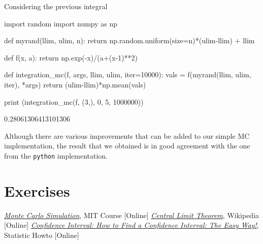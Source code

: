 Considering the previous integral

\begin{ipython}
import random 
import numpy as np

def myrand(llim, ulim, n):
    return np.random.uniform(size=n)*(ulim-llim) + llim

def f(x, a):
    return np.exp(-x)/(a+(x-1)**2)

def integration_mc(f, args, llim, ulim, iter=10000):
    vals = f(myrand(llim, ulim, iter), *args)
    return (ulim-llim)*np.mean(vals)

print (integration_mc(f, (3,), 0, 5, 1000000))
\end{ipython}
\begin{ioutput}
0.28061306413101306
\end{ioutput} 
 
Although there are various improvements that can be added to our simple MC implementation, the result that we obtained is in good agreement with the one from the \texttt{python} implementation.  
 
\section*{Exercises}


\begin{thebibliography}{9}
\href{https://www.youtube.com/watch?v=OgO1gpXSUzU}{\emph{Monte Carlo Simulation}}, MIT Course [Online]
 \href{https://en.wikipedia.org/wiki/Central_limit_theorem}{\emph{Central Limit Theorem}}, Wikipedia [Online]
\href{https://www.statisticshowto.com/probability-and-statistics/confidence-interval}{\emph{Confidence Interval: How to Find a Confidence Interval: The Easy Way!}}, Statistic Howto [Online]
\end{thebibliography}









